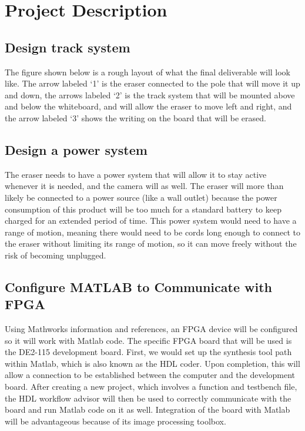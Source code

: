 \documentclass{IEEEtran}					%
\begin{document}
	\section{Project Description}
	\subsection{Design track system}
	The figure shown below is a rough layout of what the final deliverable will look like. The arrow labeled {\lq}1{\rq} is the eraser connected to the pole that will move it up and down, the arrows labeled {\lq}2{\rq} is the track system that will be mounted above and below the whiteboard, and will allow the eraser to move left and right, and the arrow labeled {\lq}3{\rq} shows the writing on the board that will be erased.
	\subsection{Design a power system}
	The eraser needs to have a power system that will allow it to stay active whenever it is needed, and the camera will as well. The eraser will more than likely be connected to a power source (like a wall outlet) because the power consumption of this product will be too much for a standard battery to keep charged for an extended period of time. This power system would need to have a range of motion, meaning there would need to be cords long enough to connect to the eraser without limiting its range of motion, so it can move freely without the risk of becoming unplugged. 
	\subsection{Configure MATLAB to Communicate with FPGA}
	Using Mathworks information and references, an FPGA device will be configured so it will work with Matlab code. The specific FPGA board that will be used is the DE2-115 development board. First, we would set up the synthesis tool path within Matlab, which is also known as the HDL coder. Upon completion, this will allow a connection to be established between the computer and the development board. After creating a new project, which involves a function and testbench file, the HDL workflow advisor will then be used to correctly communicate with the board and run Matlab code on it as well. Integration of the board with Matlab will be advantageous because of its image processing toolbox.
	
\end{document}
